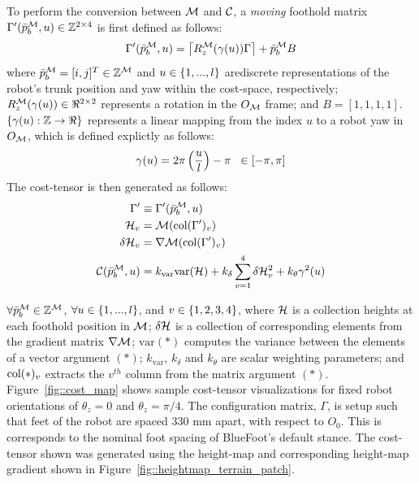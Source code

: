 			To perform the conversion between ${\cal M}$ and ${\cal C}$, a \emph{moving} foothold matrix $\Gamma'(\bar{p}^{{\cal M}}_{b},u) \in {\Bbb Z}^{2\times4}$ is first defined as follows:
				\begin{equation}
					\Gamma'(\bar{p}^{{\cal M}}_{b},u) = \left\lceil R_{z}^{{\cal M}}(\gamma(u))\Gamma \right\rceil + \bar{p}^{{\cal M}}_{b} B \\
					\label{eq::rel_feet}
				\end{equation}
			where  $\bar{p}^{{\cal M}}_{b} = [i,j]^T\in{\Bbb Z}^{{\cal M}}$ and $u \in \left\{1,...,l\right\}$ arediscrete representations of the robot's trunk position and yaw within the cost-space, respectively; $R_{z}^{{\cal M}}(\gamma(u))\in\Re^{2\times2}$ represents a rotation in the $O_{{\cal M}}$ frame; and $B = [1,1,1,1]$. $\left\{\gamma(u) : {\Bbb Z} \rightarrow \Re \right\}$ represents a linear mapping from the index $u$ to a robot yaw in $O_{{\cal M}}$, which is defined explictly as follows:
				\begin{equation} 
					\gamma(u) = 2\pi\left(\frac{u}{l}\right) - \pi \hspace{2mm} \in [-\pi,\pi]
					\label{eq::gamma}
				\end{equation}
			The cost-tensor is then generated as follows:
				\begin{equation}
					\begin{split}
						\Gamma'	 					&\equiv \Gamma'(\bar{p}^{{\cal M}}_{b},u)  \\
						{\cal H}_{v} 			&=		{\cal M}(\text{col}(\Gamma')_{v})	 \\
						\delta {\cal H}_{v} 	&= 		\nabla {\cal M}(\text{col}(\Gamma')_{v}) \\
						{\cal C}(\bar{p}^{{\cal M}}_{b},u) 	&= k_{\text{var}} \text{var}({\cal H}) + k_{\delta}\sum_{v=1}^{4} \delta {\cal H}_{v}^{2} + k_{\theta} \gamma^{2}(u) 
					\end{split}
				\end{equation}

			$\forall \bar{p}^{{\cal M}}_{b} \in \mathbb{Z}^{{\cal M}}$, $\forall u \in \left\{1,...,l\right\}$, and  $v \in \left\{1,2,3,4\right\}$, where ${\cal H}$ is a collection heights at each foothold position in ${\cal M}$; $\delta{\cal H}$ is a collection of corresponding elements from the gradient matrix $\nabla {\cal M}$; $\text{var}(*)$ computes the variance between the elements of a vector argument $(*)$; $k_{\text{var}}$, $k_{\delta}$ and $k_{\theta}$ are scalar weighting parameters; and $\text{col}(*)_{v}$ extracts the $v^{th}$ column from the matrix argument $(*)$. Figure~\ref{fig::cost_map} shows sample cost-tensor visualizations for fixed robot orientations of $\theta_{z}=0$ and $\theta_{z}=\pi/4$. The configuration matrix, $\Gamma$, is setup such that feet of the robot are spaced $330\text{ mm}$ apart, with respect to $O_{0}$. This is corresponds to the nominal foot spacing of BlueFoot's default stance. The cost-tensor shown was generated using the height-map and corresponding height-map gradient shown in Figure~\ref{fig::heightmap_terrain_patch}.

